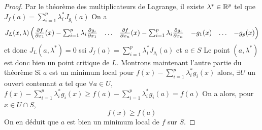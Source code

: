 \begin{proof}
    Par le théorème des multiplicateurs de Lagrange,
    il existe $\lambda^* \in \mathbb{R}^p$ tel que $J_f(a) = \sum_{i = 1}^p\lambda_i^*J_{g_i}(a)$
    On a $$J_L(x,\lambda)\begin{pmatrix}
        \frac{\partial f}{\partial x_1}(x)-\sum_{i=1}^p\lambda_i\frac{\partial g_i}{\partial x_1}&\ldots 
        &\frac{\partial f}{\partial x_n}(x)-\sum_{i=1}^p\lambda_i\frac{\partial g_i}{\partial x_n} & -g_1(x)&\ldots & -g_p(x)
    \end{pmatrix}$$
    et donc $J_L(a,\lambda^*) = 0$ ssi $J_f(a) = \sum_{i = 1}^p\lambda_i^*J_{g_i}(a)$ et $a\in S$
    Le point $(a,\lambda^*)$ est donc bien un point critique de $L$.
    Montrons maintenant l'autre partie du théorème
    Si $a$ est un minimum local pour $f(x)-\sum_{i = 1}^p\lambda_i^*g_i(x)$ alors, $\exists U$ un ouvert contenant $a$ tel que 
    $\forall a \in U$, $f(x)-\sum_{i = 1}^p\lambda_i^*g_i(x) \ge f(a)-\sum_{i = 1}^p\lambda_i^*g_i(a) = f(a)$
On a alors, pour $x\in U\cap S$,
$$ f(x) \ge f(a)$$
On en déduit que $a$ est bien un minimum local de $f$ sur $S$.
\end{proof}

